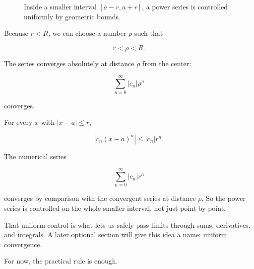 \begin{figure}[h]
\centering
{}
\caption{Inside a smaller interval \([a-r,a+r]\), a power series is controlled uniformly by geometric bounds.}
\label{fig:safe-interval-inside-radius}
\end{figure}

Because \(r<R\), we can choose a number \(\rho\) such that

\[
r<\rho<R.
\]

The series converges absolutely at distance \(\rho\) from the center:

\[
\sum_{n=0}^{\infty}|c_n|\rho^n
\]

converges.

For every \(x\) with \(|x-a|\le r\),

\[
|c_n(x-a)^n|
\le
|c_n|r^n.
\]

The numerical series

\[
\sum_{n=0}^{\infty}|c_n|r^n
\]

converges by comparison with the convergent series at distance \(\rho\).  So the power
series is controlled on the whole smaller interval, not just point by point.

That uniform control is what lets us safely pass limits through sums, derivatives, and
integrals.  A later optional section will give this idea a name: uniform convergence.

For now, the practical rule is enough.

